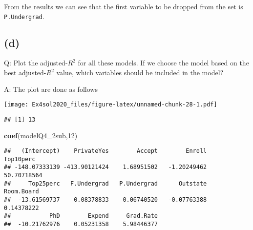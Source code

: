 \documentclass[
]{article}
\newenvironment{Shaded}{\begin{snugshade}}{\end{snugshade}}
\newcommand{\DecValTok}[1]{\textcolor[rgb]{0.00,0.00,0.81}{#1}}
\newcommand{\KeywordTok}[1]{\textcolor[rgb]{0.13,0.29,0.53}{\textbf{#1}}}
\newcommand{\NormalTok}[1]{#1}
\newcommand{\OperatorTok}[1]{\textcolor[rgb]{0.81,0.36,0.00}{\textbf{#1}}}
\begin{document}
From the results we can see that the first variable to be dropped from
the set is \texttt{P.Undergrad}.

\hypertarget{d-1}{%
\subsection{(d)}\label{d-1}}

Q: Plot the adjusted-\(R^{2}\) for all these models. If we choose the
model based on the best adjusted-\(R^{2}\) value, which variables should
be included in the model?

A: The plot are done as follows

\begin{Shaded}
\end{Shaded}

\texttt{[image: Ex4sol2020\_files/figure-latex/unnamed-chunk-28-1.pdf]}

\begin{Shaded}
\end{Shaded}

\begin{verbatim}
## [1] 13
\end{verbatim}

\begin{Shaded}
\begin{Highlighting}[]
\KeywordTok{coef}\NormalTok{(modelQ4_2sub,}\DecValTok{12}\NormalTok{)}
\end{Highlighting}
\end{Shaded}

\begin{verbatim}
##   (Intercept)    PrivateYes        Accept        Enroll     Top10perc 
## -148.07333139 -413.90121424    1.68951502   -1.20249462   50.70718564 
##     Top25perc   F.Undergrad   P.Undergrad      Outstate    Room.Board 
##  -13.61569737    0.08378833    0.06740520   -0.07763388    0.14378222 
##           PhD        Expend     Grad.Rate 
##  -10.21762976    0.05231358    5.98446377
\end{verbatim}
\end{document}
